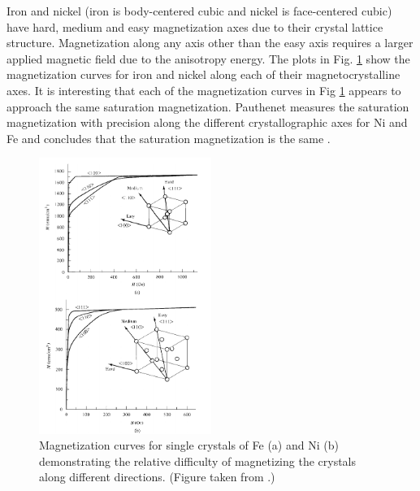 \documentclass[12pt]{article}
\begin{document}
Iron and nickel (iron is body-centered cubic and nickel is face-centered cubic) have hard, medium and easy magnetization axes due to their crystal lattice structure. Magnetization along any axis other than the easy axis requires a larger applied magnetic field due to the anisotropy energy. The plots in Fig. \ref{fig:anisotropy_Ni_Fe} show the magnetization curves for iron and nickel along each of their magnetocrystalline axes. It is interesting that each of the magnetization curves in Fig \ref{fig:anisotropy_Ni_Fe} appears to approach the same saturation magnetization. Pauthenet measures the saturation magnetization with precision along the different crystallographic axes for Ni and Fe and concludes that the saturation magnetization is the same \cite{PauthenetNov1982}. 
\begin{figure}[ht]
\centering
\includegraphics[width=0.5\textwidth]{anisotropy_Ni_Fe.png}
\caption{Magnetization curves for single crystals of Fe (a) and Ni (b) demonstrating the relative difficulty of magnetizing the crystals along different directions. (Figure taken from \cite{Cullity2008}.)}
\label{fig:anisotropy_Ni_Fe}
\end{figure}
\end{document}

